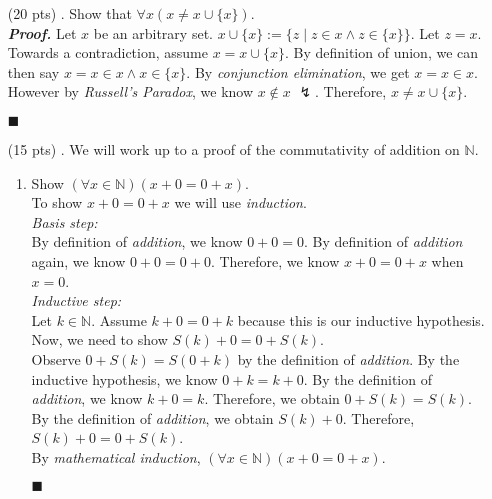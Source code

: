 \documentclass[11pt,a4paper]{article}
\begin{document}
\begin{enumerate}
    \item[(20 pts) \quad 2.]
    Show that $\forall x (x \neq x \cup \{x\}) $. \\
    \emph{\textbf{Proof.}} Let $x$ be an arbitrary set. $x \cup \{x\} := \{z \mid z \in x \land z \in \{x\} \} $.
    Let $z = x $. Towards a contradiction, assume $x = x \cup \{x\}. $ By definition of union, we can then say $x = x \in x \land x \in \{x\} $. By \emph{conjunction elimination}, we get $x = x \in x $.  However by \emph{Russell's Paradox}, we know $x \notin x $ $\lightning$.
    Therefore, $x \neq x \cup \{x\} $.
    \begin{flushright}
        $\blacksquare$
    \end{flushright}

    \item[(15 pts) \quad 3.]
    We will work up to a proof of the commutativity of addition on $\mathbb{N}$.
    \begin{enumerate}
        
        \item 
        Show $(\forall x \in \mathbb{N})(x + 0 = 0 + x) $. \\
        To show $x + 0 = 0 + x $ we will use \emph{induction}. \\
        \emph{Basis step:} \\
        By definition of \emph{addition}, we know $0 + 0 = 0 $. By definition of \emph{addition} again, we know $0 + 0 = 0 + 0 $. 
        Therefore, we know $x + 0 = 0 + x $  when $x = 0 $. \\
        \emph{Inductive step:} \\
        Let $k \in \mathbb{N} $. Assume $k + 0 = 0 + k $ because this is our inductive hypothesis.
        Now, we need to show $S(k) + 0 = 0 + S(k) $. \\
        Observe $0 + S(k) = S(0 + k) $ by the definition of \emph{addition}. By the inductive hypothesis, we know $0 + k = k + 0 $. By the definition of \emph{addition}, we know $k + 0 = k $. 
        Therefore, we obtain $0 + S(k) = S(k) $. By the definition of \emph{addition}, we obtain $S(k) + 0 $. 
        Therefore, $S(k) + 0 = 0 + S(k) $.  \\
        By \emph{mathematical induction}, $(\forall x \in \mathbb{N})(x + 0 = 0 + x) $.
        \begin{flushright}
            $\blacksquare$
        \end{flushright}


\end{enumerate}
\end{enumerate}
\end{document}
